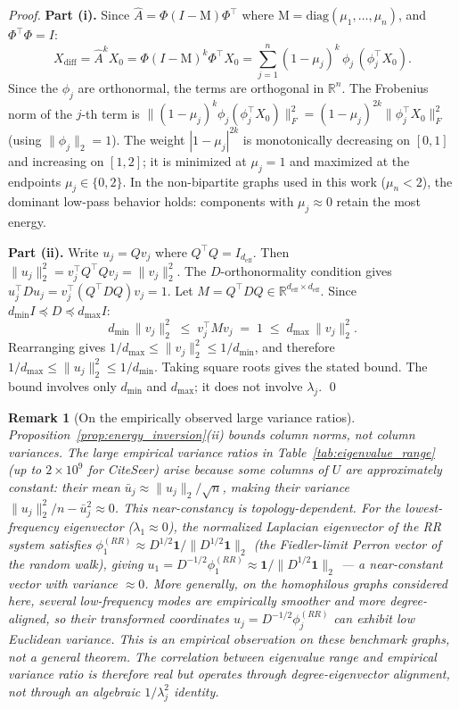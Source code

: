 \documentclass[11pt]{article}
\newtheorem{remark}{Remark}
\begin{document}
\begin{proof}
\textbf{Part (i).}
Since $\hat{A} = \Phi(I-\mathrm{M})\Phi^\top$ where $\mathrm{M} = \mathrm{diag}(\mu_1,\ldots,\mu_n)$,
and $\Phi^\top\Phi = I$:
\[
  X_{\mathrm{diff}} = \hat{A}^k X_0
  = \Phi(I-\mathrm{M})^k\Phi^\top X_0
  = \sum_{j=1}^n (1-\mu_j)^k\,\phi_j\,(\phi_j^\top X_0).
\]
Since the $\phi_j$ are orthonormal, the terms are orthogonal in $\mathbb{R}^n$.
The Frobenius norm of the $j$-th term is
$\|(1-\mu_j)^k\phi_j(\phi_j^\top X_0)\|_F^2
= (1-\mu_j)^{2k}\|\phi_j^\top X_0\|_F^2$
(using $\|\phi_j\|_2 = 1$).
The weight $|1-\mu_j|^{2k}$ is
monotonically decreasing on $[0,1]$ and increasing on $[1,2]$; it is minimized at
$\mu_j = 1$ and maximized at the endpoints $\mu_j \in \{0,2\}$.
In the non-bipartite graphs used in this work ($\mu_n < 2$), the dominant
low-pass behavior holds: components with $\mu_j \approx 0$ retain the most energy.

\textbf{Part (ii).}
Write $u_j = Qv_j$ where $Q^\top Q = I_{d_{\mathrm{eff}}}$.
Then $\|u_j\|_2^2 = v_j^\top Q^\top Q v_j = \|v_j\|_2^2$.
The $D$-orthonormality condition gives
$u_j^\top D u_j = v_j^\top(Q^\top D Q)v_j = 1$.
Let $M = Q^\top D Q \in \mathbb{R}^{d_{\mathrm{eff}}\times d_{\mathrm{eff}}}$.
Since $d_{\min}I \preceq D \preceq d_{\max}I$:
\[
  d_{\min}\,\|v_j\|_2^2 \;\leq\; v_j^\top M v_j \;=\; 1
  \;\leq\; d_{\max}\,\|v_j\|_2^2.
\]
Rearranging gives $1/d_{\max} \leq \|v_j\|_2^2 \leq 1/d_{\min}$,
and therefore $1/d_{\max} \leq \|u_j\|_2^2 \leq 1/d_{\min}$.
Taking square roots gives the stated bound.
The bound involves only $d_{\min}$ and $d_{\max}$; it does not
involve $\lambda_j$.  \qed
\end{proof}

\begin{remark}[On the empirically observed large variance ratios]
\label{rem:variance_ratios}
Proposition~\ref{prop:energy_inversion}(ii) bounds column \emph{norms}, not column
\emph{variances}.
The large empirical variance ratios in Table~\ref{tab:eigenvalue_range} (up to
$2{\times}10^9$ for CiteSeer) arise because some columns of $U$ are approximately
constant: their mean $\bar{u}_j \approx \|u_j\|_2/\sqrt{n}$, making their variance
$\|u_j\|_2^2/n - \bar{u}_j^2 \approx 0$.
This near-constancy is topology-dependent.
For the lowest-frequency eigenvector ($\lambda_1 \approx 0$), the normalized Laplacian
eigenvector of the RR system satisfies
$\phi_1^{(RR)} \approx D^{1/2}\mathbf{1}/\|D^{1/2}\mathbf{1}\|_2$
(the Fiedler-limit Perron vector of the random walk), giving
$u_1 = D^{-1/2}\phi_1^{(RR)} \approx \mathbf{1}/\|D^{1/2}\mathbf{1}\|_2$
--- a near-constant vector with variance $\approx 0$.
More generally, on the homophilous graphs considered here, several low-frequency
modes are empirically smoother and more degree-aligned, so their transformed
coordinates $u_j = D^{-1/2}\phi_j^{(RR)}$ can exhibit low Euclidean variance.
This is an empirical observation on these benchmark graphs, not a general theorem.
The correlation between eigenvalue range and empirical variance ratio is therefore
real but operates through degree-eigenvector alignment, not through an algebraic
$1/\lambda_j^2$ identity.
\end{remark}
\end{document}
